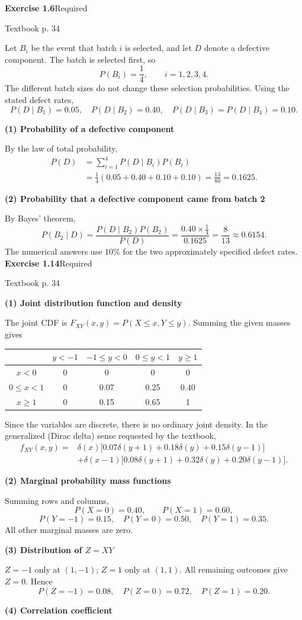 \documentclass[a4paper,11pt]{article}
\newcommand{\problem}[3]{{\LARGE\bfseries Exercise #1}\hfill #2\par{\small\color{gray}Textbook p. #3}\par\vspace{3mm}}
\newcommand{\step}[1]{\par\textbf{#1}\par}
\begin{document}
\problem{1.6}{Required}{34}
Let $B_i$ be the event that batch $i$ is selected, and let $D$ denote a defective component. The batch is selected first, so
\[
P(B_i)=\frac14,\qquad i=1,2,3,4.
\]
The different batch sizes do not change these selection probabilities. Using the stated defect rates,
\[
P(D\mid B_1)=0.05,\quad P(D\mid B_2)=0.40,\quad
P(D\mid B_3)=P(D\mid B_4)=0.10.
\]
\step{(1) Probability of a defective component}
By the law of total probability,
\begin{align*}
P(D)&=\sum_{i=1}^{4}P(D\mid B_i)P(B_i)\\
&=\frac14(0.05+0.40+0.10+0.10)
=\boxed{\frac{13}{80}=0.1625}.
\end{align*}
\step{(2) Probability that a defective component came from batch 2}
By Bayes' theorem,
\[
P(B_2\mid D)=\frac{P(D\mid B_2)P(B_2)}{P(D)}
=\frac{0.40\times\tfrac14}{0.1625}
=\boxed{\frac8{13}\approx0.6154}.
\]
The numerical answers use $10\%$ for the two approximately specified defect rates.
\newpage
\problem{1.14}{Required}{34}
\step{(1) Joint distribution function and density}
The joint CDF is $F_{XY}(x,y)=P(X\le x,Y\le y)$. Summing the given masses gives
\begin{center}\renewcommand{\arraystretch}{1.25}
\begin{tabular}{c|cccc}\toprule
& $y<-1$ & $-1\le y<0$ & $0\le y<1$ & $y\ge1$\\\midrule
$x<0$ &0&0&0&0\\
$0\le x<1$ &0&0.07&0.25&0.40\\
$x\ge1$ &0&0.15&0.65&1\\\bottomrule
\end{tabular}\end{center}
Since the variables are discrete, there is no ordinary joint density. In the generalized (Dirac delta) sense requested by the textbook,
\begin{align*}
f_{XY}(x,y)={}&\delta(x)\bigl[0.07\delta(y+1)+0.18\delta(y)+0.15\delta(y-1)\bigr]\\
&+\delta(x-1)\bigl[0.08\delta(y+1)+0.32\delta(y)+0.20\delta(y-1)\bigr].
\end{align*}
\step{(2) Marginal probability mass functions}
Summing rows and columns,
\[
\boxed{P(X=0)=0.40,\qquad P(X=1)=0.60,}
\]
\[
\boxed{P(Y=-1)=0.15,\quad P(Y=0)=0.50,\quad P(Y=1)=0.35.}
\]
All other marginal masses are zero.
\step{(3) Distribution of $Z=XY$}
$Z=-1$ only at $(1,-1)$; $Z=1$ only at $(1,1)$. All remaining outcomes give $Z=0$. Hence
\[
\boxed{P(Z=-1)=0.08,\quad P(Z=0)=0.72,\quad P(Z=1)=0.20.}
\]
\step{(4) Correlation coefficient}
\end{document}
